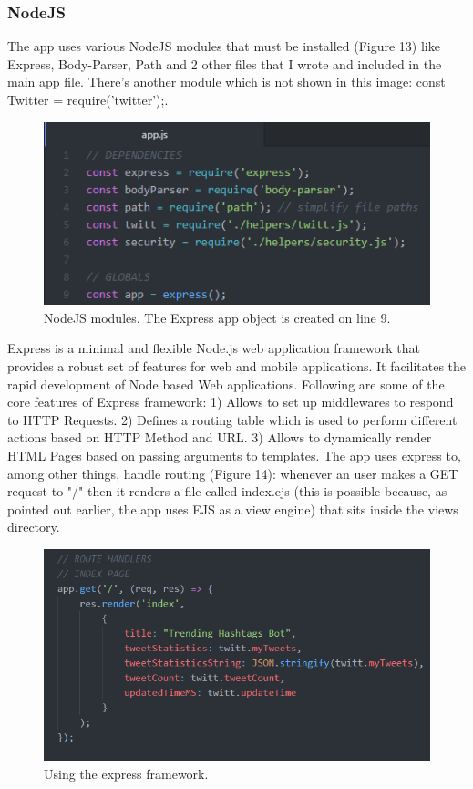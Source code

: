 \documentclass[12pt]{article} %
\begin{document}
   \subsubsection{NodeJS  \cite{nodejs}} The app uses various NodeJS modules that must be installed (Figure 13) like Express, Body-Parser, Path and 2 other files that I wrote and included in the main app file.
	There's another module which is not shown in this image: const Twitter = require('twitter');.

	\begin{figure}[H] %
	\includegraphics[width=1\linewidth]{images/NodeJS}
	\caption{NodeJS modules. The Express app object is created on line 9.}
	\label{NodeJS}
	\end{figure}

	\noindent Express \cite{express} is a minimal and flexible Node.js web application framework that provides a robust set of features for web and mobile applications.
	It facilitates the rapid development of Node based Web applications. Following are some of the core features of Express framework:
	1) Allows to set up middlewares to respond to HTTP Requests.
	2) Defines a routing table which is used to perform different actions based on HTTP Method and URL.
	3) Allows to dynamically render HTML Pages based on passing arguments to templates.
	\newline
	The app uses express to, among other things, handle routing (Figure 14): whenever an user makes a GET request to "/" then it renders a file called index.ejs (this is possible
	because, as pointed out earlier, the app uses EJS as a view engine) that sits inside the views directory.
	

	\begin{figure}[H] %
	\includegraphics[width=1\linewidth]{images/express}
	\caption{Using the express framework.}
	\label{express}
	\end{figure}
\end{document}
